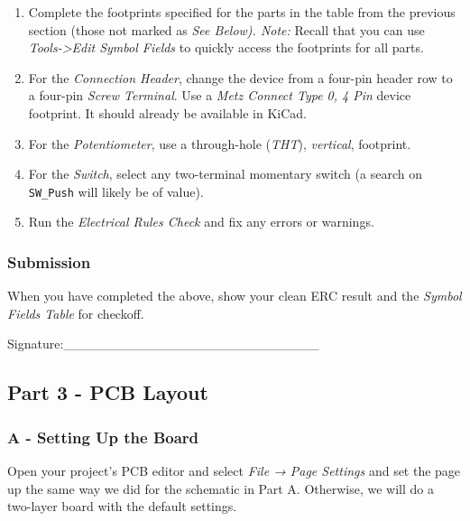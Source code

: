 \documentclass[
  letterpaper,
  DIV=11,
  numbers=noendperiod,
  oneside]{scrartcl}
\providecommand{\tightlist}{%
  \setlength{\itemsep}{0pt}\setlength{\parskip}{0pt}}\usepackage{longtable,booktabs,array}
\begin{document}
\begin{enumerate}
\def\labelenumi{\arabic{enumi}.}
\tightlist
\item
  Complete the footprints specified for the parts in the table from the
  previous section (those not marked as \emph{See Below). Note:} Recall
  that you can use \emph{Tools-\textgreater Edit Symbol Fields} to
  quickly access the footprints for all parts.
\item
  For the \emph{Connection Header}, change the device from a four-pin
  header row to a four-pin \emph{Screw Terminal}. Use a \emph{Metz
  Connect Type 0, 4 Pin} device footprint. It should already be
  available in KiCad.
\item
  For the \emph{Potentiometer}, use a through-hole (\emph{THT}),
  \emph{vertical}, footprint.
\item
  For the \emph{Switch}, select any two-terminal momentary switch (a
  search on \texttt{SW\_Push} will likely be of value).
\item
  Run the \emph{Electrical Rules Check} and fix any errors or warnings.
\end{enumerate}

\subsubsection{Submission}\label{submission-1}

When you have completed the above, show your clean ERC result and the
\emph{Symbol Fields Table} for checkoff.

\vspace{4em}

Signature:\_\_\_\_\_\_\_\_\_\_\_\_\_\_\_\_\_\_\_\_\_\_\_\_\_\_\_

\newpage{}

\subsection{Part 3 - PCB Layout}\label{part-3---pcb-layout}

\subsubsection{A - Setting Up the Board}\label{a---setting-up-the-board}

Open your project's PCB editor and select \emph{File → Page Settings}
and set the page up the same way we did for the schematic in Part A.
Otherwise, we will do a two-layer board with the default settings.
\end{document}
